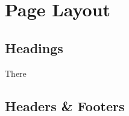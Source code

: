 \setchapterpreamble[u]{\margintoc}
\chapter{Page Layout}

\section{Headings}

There 

\section{Headers \& Footers}

